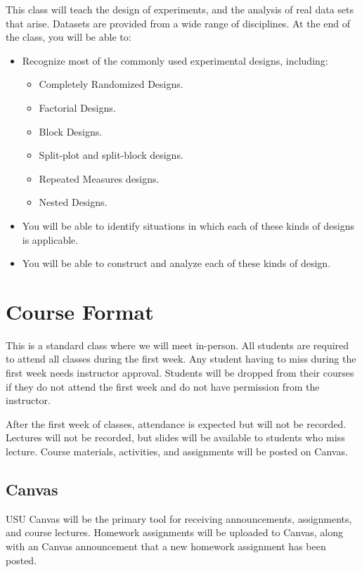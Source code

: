 \documentclass[11pt]{article}\usepackage[]{graphicx}\usepackage[]{xcolor}
\begin{document}
This class will teach the design of experiments, and the analysis of real data sets that arise.
Datasets are provided from a wide range of disciplines.
At the end of the class, you will be able to:
\begin{itemize}
  \item Recognize most of the commonly used experimental designs, including:
  \begin{itemize}
    \item Completely Randomized Designs.
    \item Factorial Designs.
    \item Block Designs.
    \item Split-plot and split-block designs.
    \item Repeated Measures designs.
    \item Nested Designs.
  \end{itemize}
  \item You will be able to identify situations in which each of these kinds of designs is applicable.
  \item You will be able to construct and analyze each of these kinds of design.
\end{itemize}

\section{Course Format}

This is a standard class where we will meet in-person.
All students are required to attend all classes during the first week. 
Any student having to miss during the first week needs instructor approval. 
Students will be dropped from their courses if they do not attend the first week and do not have permission from the instructor.

After the first week of classes, attendance is expected but will not be recorded.
Lectures will not be recorded, but slides will be available to students who miss lecture.
Course materials, activities, and assignments will be posted on Canvas.

\subsection{Canvas}

USU Canvas will be the primary tool for receiving announcements, assignments, and course lectures.
Homework assignments will be uploaded to Canvas, along with an Canvas announcement that a new homework assignment has been posted.
\end{document}
